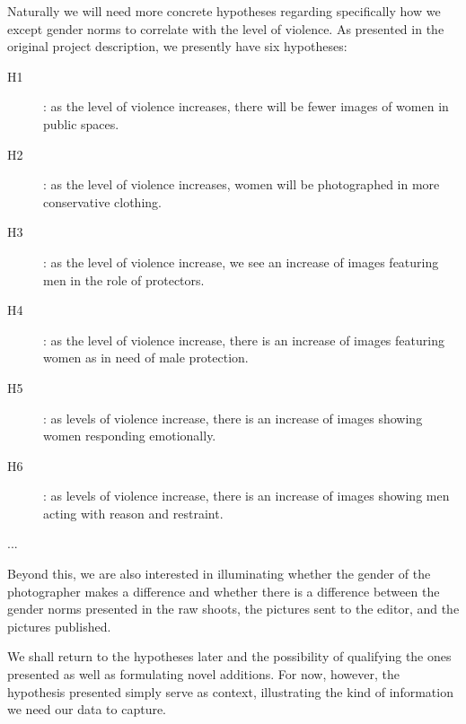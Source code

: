\documentclass[a4paper]{article}
\begin{document}
Naturally we will need more concrete hypotheses regarding specifically how we except gender norms to correlate with the level of violence.
As presented in the original project description, we presently have six hypotheses:\par

\begin{description}

    \item[H1]: as the level of violence increases, there will be fewer images of women in public spaces.
    
    \item[H2]: as the level of violence increases, women will be photographed in more conservative clothing.

    \item[H3]: as the level of violence increase, we see an increase of images featuring men in the role of protectors. 

    \item[H4]: as the level of violence increase, there is an increase of images featuring women as in need of male protection. 
    
    \item[H5]: as levels of violence increase, there is an increase of images showing women responding emotionally.

    \item[H6]: as levels of violence increase, there is an increase of images showing men acting with reason and restraint.

\end{description} \hfill \hfill ...

Beyond this, we are also interested in illuminating whether the gender of the photographer makes a difference and whether there is a difference between the gender norms presented in the raw shoots, the pictures sent to the editor, and the pictures published.\par

We shall return to the hypotheses later and the possibility of qualifying the ones presented as well as formulating novel additions. For now, however, the hypothesis presented simply serve as context, illustrating the kind of information we need our data to capture.\par
\end{document}
